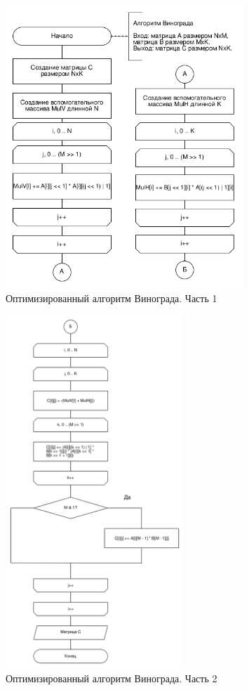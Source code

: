 \begin{figure}[h]
    \centering
    \includegraphics[width=0.8\textwidth]{images/winograd11}
    \caption{Оптимизированный алгоритм Винограда. Часть 1}
    \label{fig:images-winograd11}
\end{figure}

\clearpage

\begin{figure}[h]
    \centering
    \includegraphics[width=0.6\textwidth]{images/winograd22}
    \caption{Оптимизированный алгоритм Винограда. Часть 2}
    \label{fig:images-winograd22}
\end{figure}

